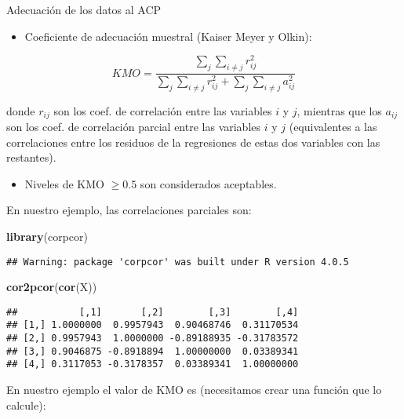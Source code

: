 \documentclass[
  spanish,
  ignorenonframetext,
]{beamer}
\newenvironment{Shaded}{\begin{snugshade}}{\end{snugshade}}
\newcommand{\KeywordTok}[1]{\textcolor[rgb]{0.13,0.29,0.53}{\textbf{#1}}}
\newcommand{\NormalTok}[1]{#1}
\providecommand{\tightlist}{%
  \setlength{\itemsep}{0pt}\setlength{\parskip}{0pt}}
\begin{document}
\begin{frame}[fragile]{Adecuación de los datos al ACP}
\protect\hypertarget{adecuaciuxf3n-de-los-datos-al-acp-1}{}
\begin{itemize}
\tightlist
\item
  Coeficiente de adecuación muestral (Kaiser Meyer y Olkin):
\end{itemize}

\[KMO=\frac{\sum_j \sum_{i\not =j} r_{i j}^2}{\sum_j \sum_{i\not =j} r^2_{i j}  +
\sum_j \sum_{i\not =j} a^2_{i j}}\]

donde \(r_{i j}\) son los coef. de correlación entre las variables \(i\)
y \(j\), mientras que los \(a_{i j}\) son los coef. de correlación
parcial entre las variables \(i\) y \(j\) (equivalentes a las
correlaciones entre los residuos de la regresiones de estas dos
variables con las restantes).

\begin{itemize}
\tightlist
\item
  Niveles de KMO \(\geq 0.5\) son considerados aceptables.
\end{itemize}

En nuestro ejemplo, las correlaciones parciales son:

\begin{Shaded}
\begin{Highlighting}[]
\KeywordTok{library}\NormalTok{(corpcor)}
\end{Highlighting}
\end{Shaded}

\begin{verbatim}
## Warning: package 'corpcor' was built under R version 4.0.5
\end{verbatim}

\begin{Shaded}
\begin{Highlighting}[]
\KeywordTok{cor2pcor}\NormalTok{(}\KeywordTok{cor}\NormalTok{(X))}
\end{Highlighting}
\end{Shaded}

\begin{verbatim}
##           [,1]       [,2]        [,3]        [,4]
## [1,] 1.0000000  0.9957943  0.90468746  0.31170534
## [2,] 0.9957943  1.0000000 -0.89188935 -0.31783572
## [3,] 0.9046875 -0.8918894  1.00000000  0.03389341
## [4,] 0.3117053 -0.3178357  0.03389341  1.00000000
\end{verbatim}

En nuestro ejemplo el valor de KMO es (necesitamos crear una función que
lo calcule):


\end{frame}
\end{document}
